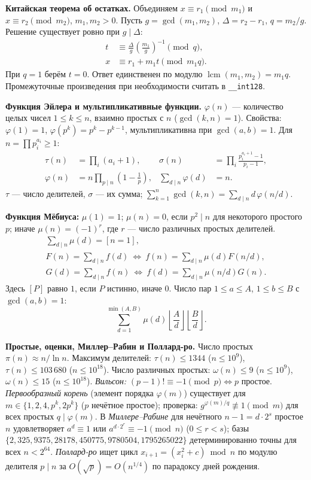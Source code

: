 \textbf{Китайская теорема об остатках.} Объединяем $x\equiv r_1\pmod{m_1}$ и $x\equiv r_2\pmod{m_2}$, $m_1,m_2>0$. Пусть $g=\gcd(m_1,m_2)$, $\Delta=r_2-r_1$, $q=m_2/g$. Решение существует ровно при $g\mid\Delta$:
\[
  \begin{aligned}
    t&\equiv \frac{\Delta}{g}\left(\frac{m_1}{g}\right)^{-1}\pmod q,\\
    x&\equiv r_1+m_1t\pmod{m_1q}.
  \end{aligned}
\]
При $q=1$ берём $t=0$. Ответ единственен по модулю $\operatorname{lcm}(m_1,m_2)=m_1q$. Промежуточные произведения при необходимости считать в \texttt{\_\_int128}.

\textbf{Функция Эйлера и мультипликативные функции.}
$\varphi(n)$ --- количество целых чисел $1\le k\le n$, взаимно простых с $n$ ($\gcd(k,n)=1$). Свойства: $\varphi(1)=1$, $\varphi(p^k)=p^k-p^{k-1}$, мультипликативна при $\gcd(a,b)=1$. Для $n=\prod p_i^{a_i}\ge1$:
\[
  \begin{aligned}
    \tau(n)&=\prod_i(a_i+1),&
    \sigma(n)&=\prod_i\frac{p_i^{a_i+1}-1}{p_i-1},\\
    \varphi(n)&=n\prod_{p\mid n}\left(1-\frac1p\right),&
    \sum_{d\mid n}\varphi(d)&=n.
  \end{aligned}
\]
$\tau$ --- число делителей, $\sigma$ --- их сумма; $\sum_{k=1}^{n}\gcd(k,n)=\sum_{d\mid n}d\,\varphi(n/d)$.

\textbf{Функция Мёбиуса:} $\mu(1)=1$; $\mu(n)=0$, если $p^2\mid n$ для некоторого простого $p$; иначе $\mu(n)=(-1)^r$, где $r$ --- число различных простых делителей.
\[
  \begin{gathered}
    \sum_{d\mid n}\mu(d)=[n=1],\\
    F(n)=\sum_{d\mid n}f(d)
    \ \Longleftrightarrow\ f(n)=\sum_{d\mid n}\mu(d)F(n/d),\\
    G(d)=\sum_{d\mid n}f(n)
    \ \Longleftrightarrow\ f(d)=\sum_{d\mid n}\mu(n/d)G(n).
  \end{gathered}
\]
Здесь $[P]$ равно $1$, если $P$ истинно, иначе $0$.
Число пар $1\le a\le A$, $1\le b\le B$ с $\gcd(a,b)=1$:
\[
  \sum_{d=1}^{\min(A,B)}\mu(d)
    \left\lfloor\frac Ad\right\rfloor
    \left\lfloor\frac Bd\right\rfloor.
\]

\textbf{Простые, оценки, Миллер--Рабин и Поллард-ро.}
Число простых $\pi(n)\approx n/\ln n$. Максимум делителей: $\tau(n)\le1344$ ($n\le10^9$), $\tau(n)\le103\,680$ ($n\le10^{18}$). Число различных простых: $\omega(n)\le9$ ($n\le10^9$), $\omega(n)\le15$ ($n\le10^{18}$).
\emph{Вильсон:} $(p-1)!\equiv-1\pmod p\iff p$ простое.
\emph{Первообразный корень} (элемент порядка $\varphi(m)$) существует для $m\in\{1,2,4,p^k,2p^k\}$ ($p$ нечётное простое); проверка: $g^{\varphi(m)/q}\not\equiv1\pmod m$ для всех простых $q\mid\varphi(m)$.
В \emph{Миллере--Рабине} для нечётного $n-1=d\cdot2^s$ простое $n$ удовлетворяет $a^d\equiv1$ или $a^{d\cdot2^r}\equiv-1\pmod n$ ($0\le r<s$); базы $\{2,\allowbreak 325,\allowbreak 9375,\allowbreak 28178,\allowbreak 450775,\allowbreak 9780504,\allowbreak 1795265022\}$ детерминированно точны для всех $n<2^{64}$.
\emph{Поллард-ро} ищет цикл $x_{i+1}=(x_i^2+c)\bmod n$ по модулю делителя $p\mid n$ за $O(\sqrt p)=O(n^{1/4})$ по парадоксу дней рождения.

